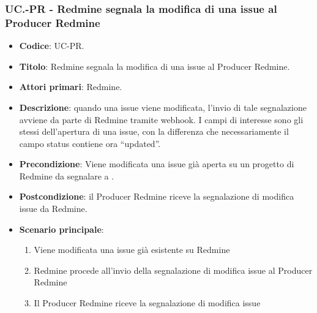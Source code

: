 
\subsubsection{UC\theuccount.\thesubuccount-PR - Redmine segnala la modifica di una issue al Producer Redmine}
\begin{itemize}
	\item \textbf{Codice}: UC\theuccount\thesubuccount-PR.
	\item \textbf{Titolo}: Redmine segnala la modifica di una issue al Producer Redmine.
	\item \textbf{Attori primari}: Redmine.
	\item \textbf{Descrizione}: quando una issue viene modificata, l'invio di tale segnalazione
	avviene da parte di Redmine tramite webhook.
	I campi di interesse sono gli stessi dell'apertura di una issue, con la differenza che necessariamente il campo status contiene ora ``updated''.
	\item \textbf{Precondizione}: Viene modificata una issue già aperta su un
	progetto di Redmine da segnalare a \progetto.
	\item \textbf{Postcondizione}: il Producer Redmine riceve la segnalazione di modifica issue da Redmine.
	\item \textbf{Scenario principale}: 
	\begin{enumerate}
		\item Viene modificata una issue già esistente su Redmine
		\item Redmine procede all'invio della segnalazione di modifica issue al Producer Redmine
        \item Il Producer Redmine riceve la segnalazione di modifica issue
	\end{enumerate}
	
\end{itemize}


